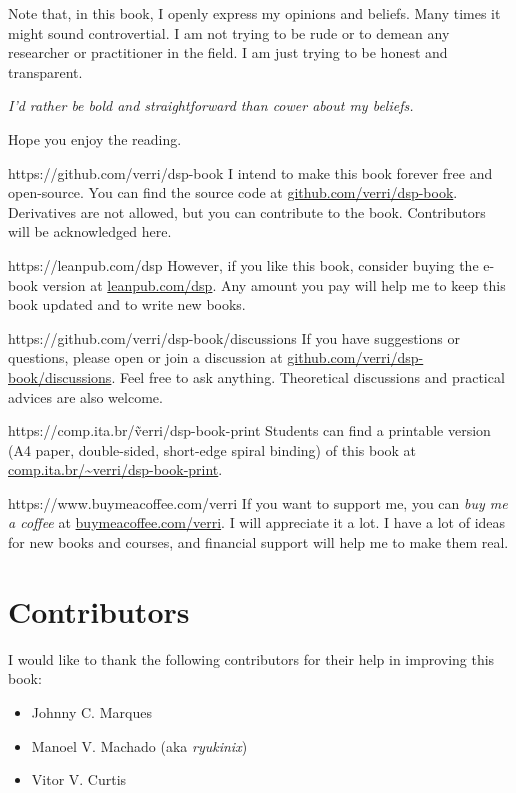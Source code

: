 Note that, in this book, I openly express my opinions and beliefs. Many times it might sound
controvertial.  I am not trying to be rude or to demean any researcher or practitioner in the
field.  I am just trying to be honest and transparent.

\vspace{1em}
\emph{I'd rather be bold and straightforward than cower about my beliefs.}
\vspace{1em}

Hope you enjoy the reading.

\newpage

\begin{parwithqr}{https://github.com/verri/dsp-book}
  I intend to make this book forever free and open-source.  You can find the source code at
  \href{\aurl}{github.com/verri/dsp-book}.  Derivatives are not allowed, but you can
  contribute to the book.  Contributors will be acknowledged here.
\end{parwithqr}

\vfill

\begin{parwithqr}{https://leanpub.com/dsp}
  However, if you like this book, consider buying the e-book version at
  \href{\aurl}{leanpub.com/dsp}.  Any amount you pay will help me to keep this book
  updated and to write new books.
\end{parwithqr}

\vfill

\begin{parwithqr}{https://github.com/verri/dsp-book/discussions}
  If you have suggestions or questions, please open or join a discussion at
  \href{\aurl}{github.com/verri/dsp-book/discussions}.  Feel free to ask anything.
  Theoretical discussions and practical advices are also welcome.
\end{parwithqr}

\vfill

\begin{parwithqr}{https://comp.ita.br/\~verri/dsp-book-print}
  Students can find a printable version (A4 paper, double-sided, short-edge spiral
  binding) of this book at \href{\aurl}{comp.ita.br/\textasciitilde{}verri/dsp-book-print}.
\end{parwithqr}

\vfill

\begin{parwithqr}{https://www.buymeacoffee.com/verri}
  If you want to support me, you can \emph{buy me a coffee} at
  \href{\aurl}{buymeacoffee.com/verri}.  I will appreciate it a lot.
  I have a lot of ideas for new books and courses, and financial support will help me to
  make them real.
\end{parwithqr}

\newpage

\section*{Contributors}

I would like to thank the following contributors for their help in improving this book:

\begin{itemize}
  \itemsep0em
  \item Johnny C. Marques
  \item Manoel V. Machado (aka \emph{ryukinix})
  \item Vitor V. Curtis
\end{itemize}
